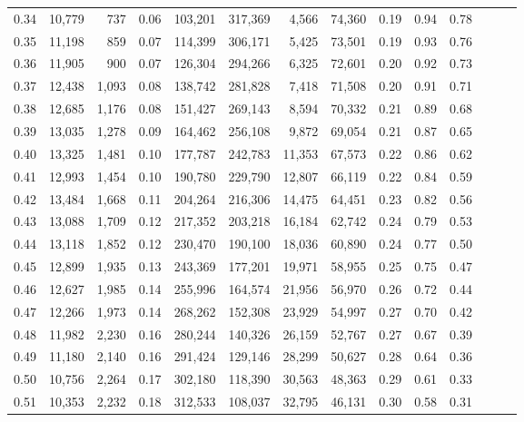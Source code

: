 \begin{tabular}{rrrrrrrrrrrrrr}
0.34 &  10,779 &    737 &  0.06 &  103,201 &  317,369 &   4,566 &  74,360 &  0.19 &  0.94 &      0.78 \\
0.35 &  11,198 &    859 &  0.07 &  114,399 &  306,171 &   5,425 &  73,501 &  0.19 &  0.93 &      0.76 \\
0.36 &  11,905 &    900 &  0.07 &  126,304 &  294,266 &   6,325 &  72,601 &  0.20 &  0.92 &      0.73 \\
0.37 &  12,438 &  1,093 &  0.08 &  138,742 &  281,828 &   7,418 &  71,508 &  0.20 &  0.91 &      0.71 \\
0.38 &  12,685 &  1,176 &  0.08 &  151,427 &  269,143 &   8,594 &  70,332 &  0.21 &  0.89 &      0.68 \\
0.39 &  13,035 &  1,278 &  0.09 &  164,462 &  256,108 &   9,872 &  69,054 &  0.21 &  0.87 &      0.65 \\
0.40 &  13,325 &  1,481 &  0.10 &  177,787 &  242,783 &  11,353 &  67,573 &  0.22 &  0.86 &      0.62 \\
0.41 &  12,993 &  1,454 &  0.10 &  190,780 &  229,790 &  12,807 &  66,119 &  0.22 &  0.84 &      0.59 \\
0.42 &  13,484 &  1,668 &  0.11 &  204,264 &  216,306 &  14,475 &  64,451 &  0.23 &  0.82 &      0.56 \\
0.43 &  13,088 &  1,709 &  0.12 &  217,352 &  203,218 &  16,184 &  62,742 &  0.24 &  0.79 &      0.53 \\
0.44 &  13,118 &  1,852 &  0.12 &  230,470 &  190,100 &  18,036 &  60,890 &  0.24 &  0.77 &      0.50 \\
0.45 &  12,899 &  1,935 &  0.13 &  243,369 &  177,201 &  19,971 &  58,955 &  0.25 &  0.75 &      0.47 \\
0.46 &  12,627 &  1,985 &  0.14 &  255,996 &  164,574 &  21,956 &  56,970 &  0.26 &  0.72 &      0.44 \\
0.47 &  12,266 &  1,973 &  0.14 &  268,262 &  152,308 &  23,929 &  54,997 &  0.27 &  0.70 &      0.42 \\
0.48 &  11,982 &  2,230 &  0.16 &  280,244 &  140,326 &  26,159 &  52,767 &  0.27 &  0.67 &      0.39 \\
0.49 &  11,180 &  2,140 &  0.16 &  291,424 &  129,146 &  28,299 &  50,627 &  0.28 &  0.64 &      0.36 \\
0.50 &  10,756 &  2,264 &  0.17 &  302,180 &  118,390 &  30,563 &  48,363 &  0.29 &  0.61 &      0.33 \\
0.51 &  10,353 &  2,232 &  0.18 &  312,533 &  108,037 &  32,795 &  46,131 &  0.30 &  0.58 &      0.31 \\

\end{tabular}

